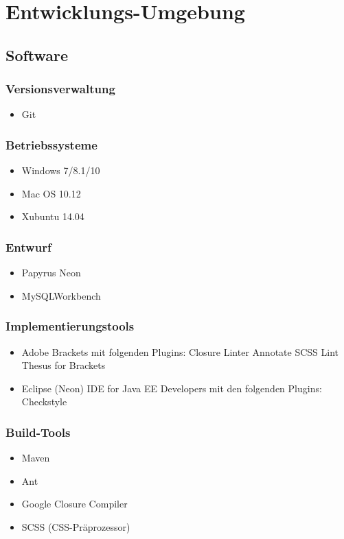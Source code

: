 \section{Entwicklungs-Umgebung}
\subsection{Software}
	\subsubsection{Versionsverwaltung}
		\begin{itemize}
			\item Git
		\end{itemize}
	\subsubsection{Betriebssysteme}
		\begin{itemize}
			\item Windows 7/8.1/10
			\item Mac OS 10.12
			\item Xubuntu 14.04
		\end{itemize}
	\subsubsection{Entwurf}
		\begin{itemize}
			\item Papyrus Neon
			\item MySQLWorkbench
		\end{itemize}
	\subsubsection{Implementierungstools}
		\begin{itemize}
			\item Adobe Brackets mit folgenden Plugins:
				\subitem Closure Linter
				\subitem Annotate
				\subitem SCSS Lint
				\subitem Thesus for Brackets
			\item Eclipse (Neon) IDE for Java EE Developers mit den folgenden Plugins:
				\subitem Checkstyle
		\end{itemize}
	\subsubsection{Build-Tools}
		\begin{itemize}
			\item Maven
			\item Ant
			\item Google Closure Compiler
			\item SCSS (CSS-Präprozessor)
		\end{itemize}
